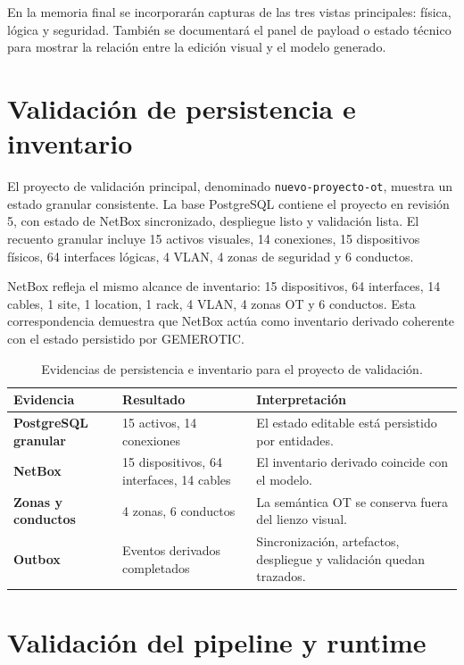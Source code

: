 En la memoria final se incorporarán capturas de las tres vistas principales: física, lógica y seguridad. También se documentará el panel de payload o estado técnico para mostrar la relación entre la edición visual y el modelo generado.

\section{Validación de persistencia e inventario} \label{sec:validacion-inventario}

El proyecto de validación principal, denominado \texttt{nuevo-proyecto-ot}, muestra un estado granular consistente. La base PostgreSQL contiene el proyecto en revisión 5, con estado de NetBox sincronizado, despliegue listo y validación lista. El recuento granular incluye 15 activos visuales, 14 conexiones, 15 dispositivos físicos, 64 interfaces lógicas, 4 VLAN, 4 zonas de seguridad y 6 conductos.

NetBox refleja el mismo alcance de inventario: 15 dispositivos, 64 interfaces, 14 cables, 1 site, 1 location, 1 rack, 4 VLAN, 4 zonas OT y 6 conductos. Esta correspondencia demuestra que NetBox actúa como inventario derivado coherente con el estado persistido por GEMEROTIC.

\begin{table}[H]
    \centering
    \small
    \renewcommand{\arraystretch}{1.35}
    \begin{tabularx}{\textwidth}{>{\bfseries}p{4cm}p{3cm}X}
        \toprule
        Evidencia & Resultado & Interpretación \\
        \midrule
        PostgreSQL granular & 15 activos, 14 conexiones & El estado editable está persistido por entidades. \\
        NetBox & 15 dispositivos, 64 interfaces, 14 cables & El inventario derivado coincide con el modelo. \\
        Zonas y conductos & 4 zonas, 6 conductos & La semántica OT se conserva fuera del lienzo visual. \\
        Outbox & Eventos derivados completados & Sincronización, artefactos, despliegue y validación quedan trazados. \\
        \bottomrule
    \end{tabularx}
    \caption{Evidencias de persistencia e inventario para el proyecto de validación.}
    \label{tab:evidencias-persistencia-inventario}
\end{table}

\section{Validación del pipeline y runtime} \label{sec:validacion-pipeline}

